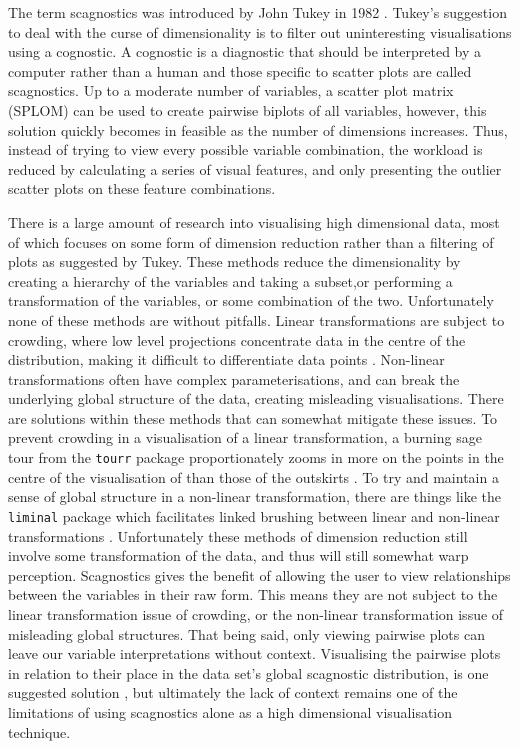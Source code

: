 The term scagnostics was introduced by John Tukey in 1982 \citep{tukey}.
Tukey's suggestion to deal with the curse of dimensionality is to filter
out uninteresting visualisations using a cognostic. A cognostic is a
diagnostic that should be interpreted by a computer rather than a human
and those specific to scatter plots are called scagnostics. Up to a
moderate number of variables, a scatter plot matrix (SPLOM) can be used
to create pairwise biplots of all variables, however, this solution
quickly becomes in feasible as the number of dimensions increases. Thus,
instead of trying to view every possible variable combination, the
workload is reduced by calculating a series of visual features, and only
presenting the outlier scatter plots on these feature combinations.

There is a large amount of research into visualising high dimensional
data, most of which focuses on some form of dimension reduction rather
than a filtering of plots as suggested by Tukey. These methods reduce
the dimensionality by creating a hierarchy of the variables and taking a
subset,or performing a transformation of the variables, or some
combination of the two. Unfortunately none of these methods are without
pitfalls. Linear transformations are subject to crowding, where low
level projections concentrate data in the centre of the distribution,
making it difficult to differentiate data points \citep{crowding}.
Non-linear transformations often have complex parameterisations, and can
break the underlying global structure of the data, creating misleading
visualisations. There are solutions within these methods that can
somewhat mitigate these issues. To prevent crowding in a visualisation
of a linear transformation, a burning sage tour from the \texttt{tourr}
package proportionately zooms in more on the points in the centre of the
visualisation of than those of the outskirts \citep{burningsage}. To try
and maintain a sense of global structure in a non-linear transformation,
there are things like the \texttt{liminal} package which facilitates
linked brushing between linear and non-linear transformations
\citep{liminal}. Unfortunately these methods of dimension reduction
still involve some transformation of the data, and thus will still
somewhat warp perception. Scagnostics gives the benefit of allowing the
user to view relationships between the variables in their raw form. This
means they are not subject to the linear transformation issue of
crowding, or the non-linear transformation issue of misleading global
structures. That being said, only viewing pairwise plots can leave our
variable interpretations without context. Visualising the pairwise plots
in relation to their place in the data set's global scagnostic
distribution, is one suggested solution \citep{scagexplorer}, but
ultimately the lack of context remains one of the limitations of using
scagnostics alone as a high dimensional visualisation technique.

